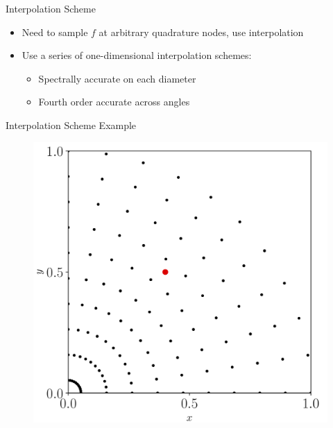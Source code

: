 \documentclass{beamer}
\begin{document}
\begin{frame}{Interpolation Scheme}
    \begin{itemize}
        \item
            Need to sample $f$ at arbitrary quadrature nodes, use interpolation
        \item
            Use a series of one-dimensional interpolation schemes:
        \begin{itemize}
            \item
                Spectrally accurate on each diameter
            \item
                Fourth order accurate across angles
        \end{itemize}
    \end{itemize}
\end{frame}

\begin{frame}{Interpolation Scheme Example}
	\begin{figure}[H]
		\centering
		\includegraphics[scale=0.5]{figures/Interp1.png}
	\end{figure}
\end{frame}
\end{document}
